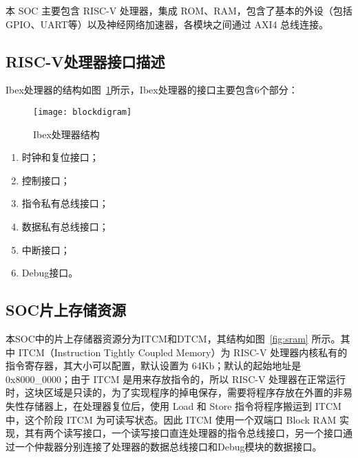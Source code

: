 本 SOC 主要包含 RISC-V 处理器，集成 ROM、RAM，包含了基本的外设（包括GPIO、UART等）以及神经网络加速器，各模块之间通过 AXI4 总线连接。

\subsection{RISC-V处理器接口描述}
Ibex处理器的结构如图~\ref{fig:blockdigram}所示，Ibex处理器的接口主要包含6个部分：

\begin{figure}[htbp]
    \centering
    \texttt{[image: blockdigram]}
    \caption{Ibex处理器结构}
    \label{fig:blockdigram}
\end{figure}

\begin{enumerate}
    \item 时钟和复位接口；
    \item 控制接口；
    \item 指令私有总线接口；
    \item 数据私有总线接口；
    \item 中断接口；
    \item Debug接口。
\end{enumerate}

%
%
%

\subsection{SOC片上存储资源}
本SOC中的片上存储器资源分为ITCM和DTCM，其结构如图~\ref{fig:sram} 所示。其中 ITCM（Instruction Tightly Coupled Memory）为 RISC-V 处理器内核私有的指令寄存器，其大小可以配置，默认设置为 64Kb；默认的起始地址是 0x8000\_0000；由于 ITCM 是用来存放指令的，所以 RISC-V 处理器在正常运行时，这块区域是只读的，为了实现程序的掉电保存，需要将程序存放在外置的非易失性存储器上，在处理器复位后，使用 Load 和 Store 指令将程序搬运到 ITCM 中，这个阶段 ITCM 为可读写状态。因此 ITCM 使用一个双端口 Block RAM 实现，其有两个读写接口，一个读写接口直连处理器的指令总线接口，另一个接口通过一个仲裁器分别连接了处理器的数据总线接口和Debug模块的数据接口。

